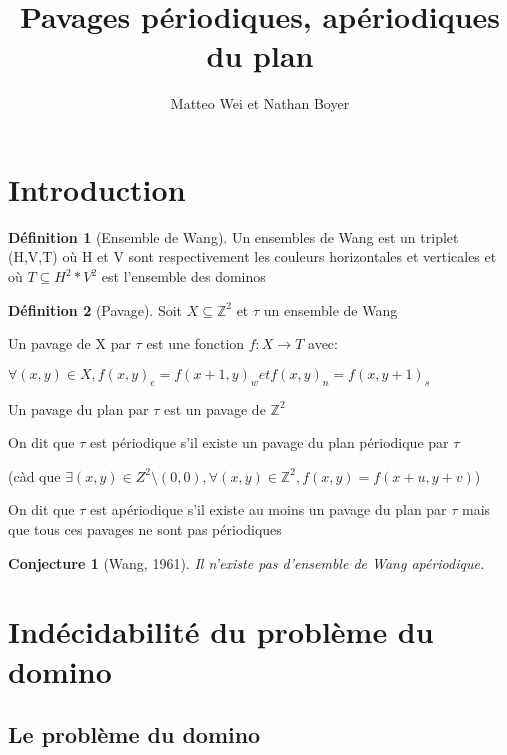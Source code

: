 \documentclass{scrartcl}
\title{Pavages périodiques, apériodiques du plan}
\author{Matteo Wei et Nathan Boyer}
\newcommand{\Z}{\mathbb Z}
\newcommand{\sube}{\subseteq}
\newtheorem{conjecture}{Conjecture}
\theoremstyle{definition}
\newtheorem{definition}{Définition}
\theoremstyle{remark}
\begin{document}
\maketitle

\section{Introduction}

\begin{definition}[Ensemble de Wang]
    
Un ensembles de Wang est un triplet (H,V,T) où H et V sont respectivement les couleurs horizontales et verticales
et où $T \sube H^2 * V^2$ est l'ensemble des dominos

\end{definition}

\begin{definition}[Pavage]

Soit $X \sube \Z^2$ et $\tau$ un ensemble de Wang

Un pavage de X par $\tau$ est une fonction $f:X \to T$ avec:

$\forall (x,y) \in X, {f(x,y)}_e = {f(x+1,y)}_w et {f(x,y)}_n = {f(x,y+1)}_s$

Un pavage du plan par $\tau$ est un pavage de $\Z^2$

On dit que $\tau$ est périodique s'il existe un pavage du plan périodique par $\tau$

(càd que $\exists (x,y) \in Z^2 \setminus (0,0), \forall (x,y) \in \Z^2, f(x,y) = f(x+u,y+v)$)

On dit que $\tau$ est apériodique s'il existe au moins un pavage du plan par $\tau$ mais que tous ces pavages ne sont pas périodiques

\begin{conjecture}[Wang, 1961]
  Il n'existe pas d'ensemble de Wang apériodique.
\end{conjecture}
    
\end{definition}



\section{Indécidabilité du problème du domino}

\subsection{Le problème du domino}
\end{document}
